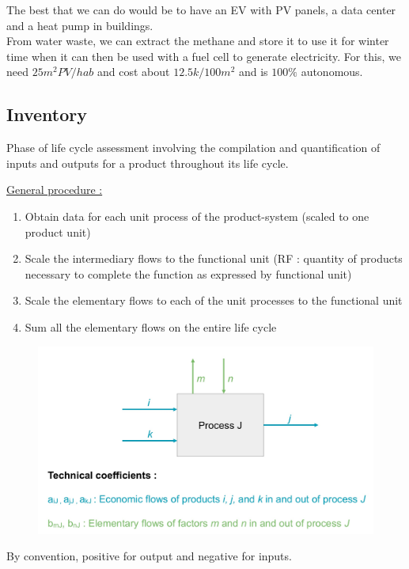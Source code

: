 \documentclass[../main.tex]{subfiles}
\begin{document}
The best that we can do would be to have an EV with PV panels, a data center and a heat pump in buildings.\\
From water waste, we can extract the methane and store it to use it for winter time when it can then be used with a fuel cell to generate electricity. For this, we need $25 m^2 PV/hab$ and cost about $12.5 k$\texteuro$/100m^2$ and is $100\%$ autonomous.\\

\subsection{Inventory}

\begin{theorem}
    Phase of life cycle assessment involving the compilation and quantification of inputs and outputs for a product throughout its life cycle.
\end{theorem}

\quad \underline{General procedure :}\\
\begin{enumerate}
    \item Obtain data for each unit process of the product-system (scaled to one product unit)
    \item Scale the intermediary flows to the functional unit (RF : quantity of products necessary to complete the function as expressed by functional unit)
    \item Scale the elementary flows to each of the unit processes to the functional unit
    \item Sum all the elementary flows on the entire life cycle
\end{enumerate}

\begin{figure}[hbt!]
    \centering
    \includegraphics[width=0.6\linewidth]{IMAGES/LCA/IMG_0185.jpeg}
\end{figure}
By convention, positive for output and negative for inputs.\\
\end{document}
